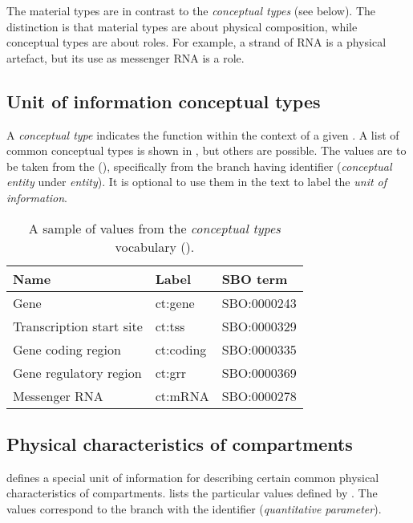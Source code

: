 The material types are in contrast to the \emph{conceptual types} (see below).  The distinction is that material types are about physical composition, while conceptual types are about roles.  For example, a strand of RNA is a physical artefact, but its use as messenger RNA is a role.

\subsection{Unit of information conceptual types}
\label{sec:af:conceptual-types-cv}

A \emph{conceptual type} indicates the function within the context of a given \AF.  A list of common conceptual types is shown in , but others are possible.  The values are to be taken from the \sbo (\sbourl), specifically from the branch having identifier  ($\!$\emph{conceptual entity} under \emph{entity}). It is optional to use them in the text to label the \emph{unit of information}. 

\begin{table}[h]
  \centering
  \begin{tabular}{l>{\ttfamily}l>{\ttfamily}l}
    \toprule
    \textbf{Name}              & \textbf{\rmfamily Label} & \textbf{\rmfamily SBO term} \\
    \midrule
    Gene                      & ct:gene   & SBO:0000243\\
    Transcription start site  & ct:tss    & SBO:0000329\\
    Gene coding region        & ct:coding & SBO:0000335\\
    Gene regulatory region    & ct:grr    & SBO:0000369\\
    Messenger RNA             & ct:mRNA   & SBO:0000278\\
    \bottomrule
  \end{tabular}
  \caption{A sample of values from the \emph{conceptual types} vocabulary
    ().}
  \label{tab:af:conceptual-types-cv}
\end{table}

\subsection{Physical characteristics of compartments}
\label{sec:af:physical-characteristics-cv}

\SBGNAFLone defines a special unit of information for describing certain common physical characteristics of compartments.   lists the particular values defined by \SBGNAFLone.  The values correspond to the \sbo branch with the identifier  (\emph{quantitative parameter}).

